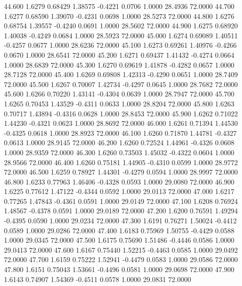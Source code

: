   44.600   1.6279   0.68429   1.38575  -0.4221   0.0706   1.0000  28.4936  72.0000
  44.700   1.6277   0.68590   1.39070  -0.4231   0.0698   1.0000  28.5273  72.0000
  44.800   1.6276   0.68754   1.39557  -0.4240   0.0691   1.0000  28.5602  72.0000
  44.900   1.6275   0.68920   1.40038  -0.4249   0.0684   1.0000  28.5923  72.0000
  45.000   1.6274   0.69089   1.40511  -0.4257   0.0677   1.0000  28.6236  72.0000
  45.100   1.6273   0.69261   1.40976  -0.4266   0.0670   1.0000  28.6541  72.0000
  45.200   1.6271   0.69437   1.41432  -0.4274   0.0664   1.0000  28.6839  72.0000
  45.300   1.6270   0.69619   1.41878  -0.4282   0.0657   1.0000  28.7128  72.0000
  45.400   1.6269   0.69808   1.42313  -0.4290   0.0651   1.0000  28.7409  72.0000
  45.500   1.6267   0.70007   1.42734  -0.4297   0.0645   1.0000  28.7682  72.0000
  45.600   1.6266   0.70220   1.43141  -0.4304   0.0639   1.0000  28.7947  72.0000
  45.700   1.6265   0.70453   1.43529  -0.4311   0.0633   1.0000  28.8204  72.0000
  45.800   1.6263   0.70717   1.43894  -0.4316   0.0628   1.0000  28.8453  72.0000
  45.900   1.6262   0.71022   1.44230  -0.4321   0.0623   1.0000  28.8692  72.0000
  46.000   1.6261   0.71394   1.44530  -0.4325   0.0618   1.0000  28.8923  72.0000
  46.100   1.6260   0.71870   1.44781  -0.4327   0.0613   1.0000  28.9145  72.0000
  46.200   1.6260   0.72524   1.44961  -0.4326   0.0608   1.0000  28.9359  72.0000
  46.300   1.6260   0.73503   1.45032  -0.4322   0.0604   1.0000  28.9566  72.0000
  46.400   1.6260   0.75181   1.44905  -0.4310   0.0599   1.0000  28.9772  72.0000
  46.500   1.6259   0.78927   1.44301  -0.4279   0.0594   1.0000  28.9997  72.0000
  46.800   1.6233   0.77963   1.46406  -0.4328   0.0593   1.0000  29.0080  72.0000
  46.900   1.6225   0.77612   1.47122  -0.4344   0.0592   1.0000  29.0113  72.0000
  47.000   1.6217   0.77265   1.47843  -0.4361   0.0591   1.0000  29.0149  72.0000
  47.100   1.6208   0.76924   1.48567  -0.4378   0.0591   1.0000  29.0189  72.0000
  47.200   1.6200   0.76591   1.49294  -0.4395   0.0590   1.0000  29.0234  72.0000
  47.300   1.6191   0.76271   1.50024  -0.4412   0.0589   1.0000  29.0286  72.0000
  47.400   1.6183   0.75969   1.50755  -0.4429   0.0588   1.0000  29.0345  72.0000
  47.500   1.6175   0.75690   1.51486  -0.4446   0.0586   1.0000  29.0413  72.0000
  47.600   1.6167   0.75440   1.52215  -0.4463   0.0585   1.0000  29.0492  72.0000
  47.700   1.6159   0.75222   1.52941  -0.4479   0.0583   1.0000  29.0586  72.0000
  47.800   1.6151   0.75043   1.53661  -0.4496   0.0581   1.0000  29.0698  72.0000
  47.900   1.6143   0.74907   1.54369  -0.4511   0.0578   1.0000  29.0831  72.0000
